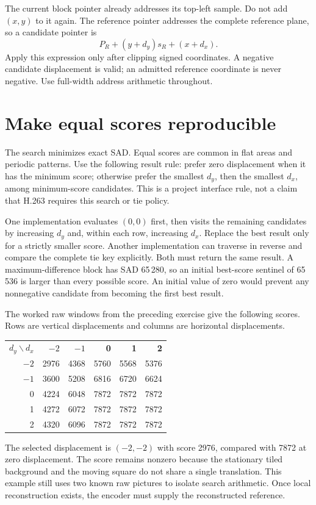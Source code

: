 The current block pointer already addresses its top-left sample. Do not add
$(x,y)$ to it again. The reference pointer addresses the complete reference
plane, so a candidate pointer is
\[
  P_R+(y+d_y)s_R+(x+d_x).
\]
Apply this expression only after clipping signed coordinates. A negative
candidate displacement is valid; an admitted reference coordinate is never
negative. Use full-width address arithmetic throughout.

\section{Make equal scores reproducible}
The search minimizes exact SAD. Equal scores are common in flat areas and
periodic patterns. Use the following result rule: prefer zero displacement when
it has the minimum score; otherwise prefer the smallest $d_y$, then the smallest
$d_x$, among minimum-score candidates. This is a project interface rule, not a
claim that H.263 requires this search or tie policy.

One implementation evaluates $(0,0)$ first, then visits the remaining candidates
by increasing $d_y$ and, within each row, increasing $d_x$. Replace the best result
only for a strictly smaller score. Another implementation can traverse in reverse
and compare the complete tie key explicitly. Both must return the same result.
A maximum-difference block has SAD 65\,280, so an initial best-score sentinel of
65\,536 is larger than every possible score. An initial value of zero would
prevent any nonnegative candidate from becoming the first best result.

The worked raw windows from the preceding exercise give the following scores.
Rows are vertical displacements and columns are horizontal displacements.
\begin{center}
  \begin{tabular}{rrrrrr}
    \textbf{$d_y\backslash d_x$} & \textbf{$-2$} & \textbf{$-1$} & \textbf{0} & \textbf{1} & \textbf{2} \\
    $-2$                         & 2976          & 4368          & 5760       & 5568       & 5376       \\
    $-1$                         & 3600          & 5208          & 6816       & 6720       & 6624       \\
    0                            & 4224          & 6048          & 7872       & 7872       & 7872       \\
    1                            & 4272          & 6072          & 7872       & 7872       & 7872       \\
    2                            & 4320          & 6096          & 7872       & 7872       & 7872
  \end{tabular}
\end{center}
The selected displacement is $(-2,-2)$ with score 2976, compared with 7872 at
zero displacement. The score remains nonzero because the stationary tiled
background and the moving square do not share a single translation. This example
still uses two known raw pictures to isolate search arithmetic. Once local
reconstruction exists, the encoder must supply the reconstructed reference.
